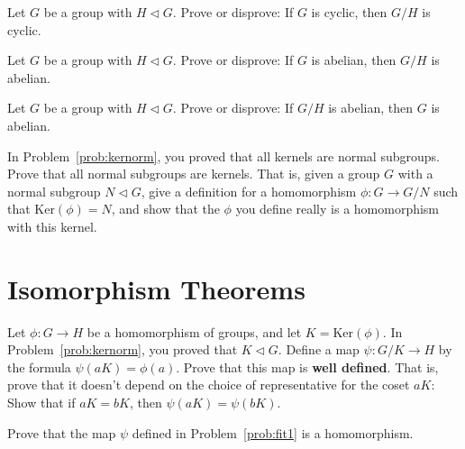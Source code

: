 \begin{problem}
Let \(G\) be a group with \(H \lhd G\). Prove or disprove: If \(G\) is cyclic, then \(G/H\) is cyclic.
\end{problem}

\begin{problem}
Let \(G\) be a group with \(H \lhd G\). Prove or disprove: If \(G\) is abelian, then \(G/H\) is abelian.
\end{problem}

\begin{problem}
Let \(G\) be a group with \(H \lhd G\). Prove or disprove: If \(G/H\) is abelian, then \(G\) is abelian.
\end{problem}

\begin{problem}\label{prob:canonproj}
 In Problem~\ref{prob:kernorm}, you proved that all kernels are normal subgroups. Prove that all normal subgroups are kernels. That is, given a group \(G\) with a normal subgroup \(N \lhd G\), give a definition for a homomorphism \(\phi: G \longrightarrow G/N \) such that \(\mbox{Ker}(\phi)=N\), and show that the $\phi$ you define really is a homomorphism with this kernel.
\begin{annotation}
\end{annotation}
\end{problem}

\section{Isomorphism Theorems}\label{sec:isothms}

\begin{problem}\label{prob:fit1}
Let \(\phi: G\longrightarrow H\) be a homomorphism of groups, and let \(K = \mbox{Ker}(\phi)\). In Problem~\ref{prob:kernorm}, you proved that \(K \lhd G\). Define a map \(\psi : G/K \longrightarrow H\) by the formula \(\psi(aK)=\phi(a)\). Prove that this map is \textbf{well defined}. That is, prove that it doesn't depend on the choice of representative for the coset \(aK\): Show that if \(aK = bK\), then \(\psi(aK)=\psi(bK)\).
\end{problem}

\begin{problem}
Prove that the map \(\psi\) defined in Problem~\ref{prob:fit1} is a homomorphism.
\end{problem}

